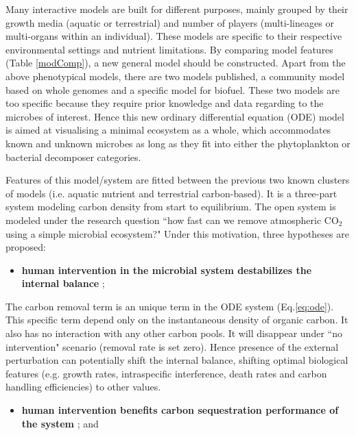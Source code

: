 \documentclass[../thesis.tex]{subfiles} %
\begin{document}
Many interactive models are built for different purposes, mainly grouped by their growth media (aquatic or terrestrial) and number of players (multi-lineages or multi-organs within an individual).  These models are specific to their respective environmental settings and nutrient limitations.  By comparing model features (Table \ref{modComp}), a new general model should be constructed.  Apart from the above phenotypical models, there are two models published, a community model based on whole genomes\autocite{harcombe2014metabolic} and a specific model for biofuel\autocite{kirthiga2014mathematical}.  These two models are too specific because they require prior knowledge and data regarding to the microbes of interest.  Hence this new ordinary differential equation (ODE) model is aimed at visualising a minimal ecosystem as a whole, which accommodates known and unknown microbes as long as they fit into either the phytoplankton or bacterial decomposer categories.

Features of this model/system are fitted between the previous two known clusters of models (i.e. aquatic nutrient and terrestrial carbon-based).  It is a three-part system modeling carbon density from start to equilibrium.  The open system is modeled under the research question ``how fast can we remove atmospheric CO$_2$ using a simple microbial ecosystem?"  Under this motivation, three hypotheses are proposed:
\begin{itemize}
    \item \textbf{human intervention in the microbial system destabilizes the internal balance}
    ;
\end{itemize}

The carbon removal term is an unique term in the ODE system (Eq.\ref{eq:ode}).  This specific term depend only on the instantaneous density of organic carbon.  It also has no interaction with any other carbon pools.  It will disappear under ``no intervention" scenario (removal rate is set zero).  Hence presence of the external perturbation can potentially shift the internal balance, shifting optimal biological features (e.g. growth rates, intraspecific interference, death rates and carbon handling efficiencies) to other values.

\begin{itemize}
    \item \textbf{human intervention benefits carbon sequestration performance of the system}
    ; and
\end{itemize}
\end{document}
